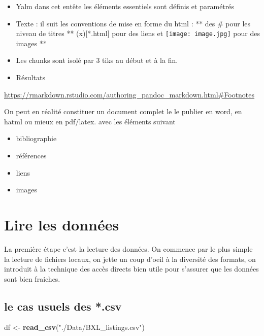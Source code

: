 \documentclass[
]{book}
\newenvironment{Shaded}{\begin{snugshade}}{\end{snugshade}}
\newcommand{\KeywordTok}[1]{\textcolor[rgb]{0.13,0.29,0.53}{\textbf{#1}}}
\newcommand{\NormalTok}[1]{#1}
\newcommand{\StringTok}[1]{\textcolor[rgb]{0.31,0.60,0.02}{#1}}
\providecommand{\tightlist}{%
  \setlength{\itemsep}{0pt}\setlength{\parskip}{0pt}}
\begin{document}
\begin{itemize}
\tightlist
\item
  Yalm dans cet entête les éléments essentiels sont définis et paramétrés
\item
  Texte : il suit les conventions de mise en forme du html :
  ** des \# pour les niveau de titres
  ** (x){[}*.html{]} pour des liens et \texttt{[image: image.jpg]} pour des images
  **
\item
  Les chunks sont isolé par 3 tiks au début et à la fin.
\item
  Résultats
\end{itemize}

\url{https://rmarkdown.rstudio.com/authoring_pandoc_markdown.html\#Footnotes}

On peut en réalité constituer un document complet le le publier en word, en hatml ou mieux en pdf/latex.
avec les éléments suivant

\begin{itemize}
\tightlist
\item
  bibliographie
\item
  références
\item
  liens
\item
  images
\end{itemize}

\hypertarget{lire-les-donnuxe9es}{%
\section{Lire les données}\label{lire-les-donnuxe9es}}

La première étape c'est la lecture des données. On commence par le plus simple la lecture de fichiers locaux, on jette un coup d'oeil à la diversité des formats, on introduit à la technique des accès directs bien utile pour s'assurer que les données sont bien fraiches.

\hypertarget{le-cas-usuels-des-.csv}{%
\subsection{le cas usuels des *.csv}\label{le-cas-usuels-des-.csv}}

\begin{Shaded}
\begin{Highlighting}[]
\NormalTok{df <-}\StringTok{ }\KeywordTok{read_csv}\NormalTok{(}\StringTok{"./Data/BXL_listings.csv"}\NormalTok{)}
\end{Highlighting}
\end{Shaded}
\end{document}
